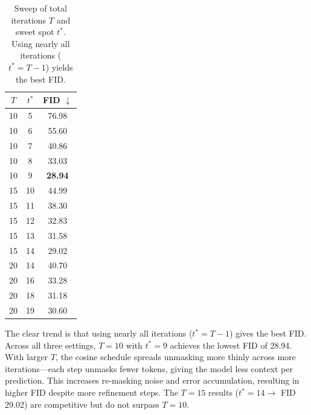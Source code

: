 \documentclass[10pt,twocolumn,letterpaper]{article}
\begin{document}
\begin{table}[h]
	\centering
	\small
	\begin{tabular}{ccc}
		\toprule
		\textbf{$T$} & \textbf{$t^*$} & \textbf{FID $\downarrow$} \\ \midrule
		10           & 5              & 76.98                     \\
		10           & 6              & 55.60                     \\
		10           & 7              & 40.86                     \\
		10           & 8              & 33.03                     \\
		10           & 9              & \textbf{28.94}            \\ \midrule
		15           & 10             & 44.99                     \\
		15           & 11             & 38.30                     \\
		15           & 12             & 32.83                     \\
		15           & 13             & 31.58                     \\
		15           & 14             & 29.02                     \\ \midrule
		20           & 14             & 40.70                     \\
		20           & 16             & 33.28                     \\
		20           & 18             & 31.18                     \\
		20           & 19             & 30.60                     \\
		\bottomrule
	\end{tabular}
	\caption{Sweep of total iterations $T$ and sweet spot $t^*$. Using nearly all iterations ($t^* = T-1$) yields the best FID.}
	\label{tab:sweep}
\end{table}

The clear trend is that using nearly all iterations ($t^* = T - 1$) gives the best FID. Across all three settings, $T=10$ with $t^*=9$ achieves the lowest FID of 28.94. With larger $T$, the cosine schedule spreads unmasking more thinly across more iterations—each step unmasks fewer tokens, giving the model less context per prediction. This increases re-masking noise and error accumulation, resulting in higher FID despite more refinement steps. The $T=15$ results ($t^*=14 \rightarrow$ FID 29.02) are competitive but do not surpass $T=10$.
\end{document}

